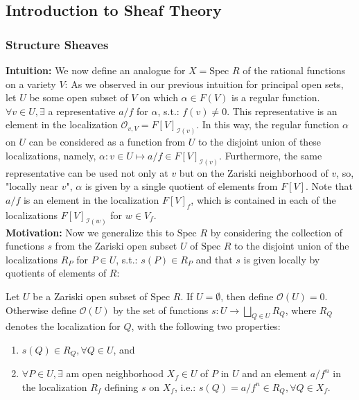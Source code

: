\subsection{Introduction to Sheaf Theory}

\subsubsection{Structure Sheaves}

\noindent\textbf{Intuition:} We now define an analogue for $X= \text{Spec }R$ of the rational functions on a variety $V$: As we observed in our previous intuition for principal open sets, let $U$ be some open subset of $V$ on which $\alpha \in F(V)$ is a regular function. $\forall v\in U, \exists$ a representative $a/f$ for $\alpha$, s.t.: $f(v) \neq 0$. This representative is an element in the localization $\mathcal{O}_{v,V} = F[V]_{\mathcal{I} (v)}$. In this way, the regular function $\alpha$ on $U$ can be considered as a function from $U$ to the disjoint union of these localizations, namely, $\alpha: v\in U \mapsto a/f \in F[V]_{\mathcal{I} (v)}$. Furthermore, the same representative can be used not only at $v$ but on the Zariski neighborhood of $v$, so, "locally near $v$", $\alpha$ is given by a single quotient of elements from $F[V]$. Note that $a/f$ is an element in the localization $F[V]_{f}$, which is contained in each of the localizations $F[V]_{\mathcal{I} (w)}$ for $w \in V_f$.\\

\noindent\textbf{Motivation:} Now we generalize this to $\text{Spec }R$ by considering the collection of functions $s$ from the Zariski open subset $U$ of $\text{Spec }R$ to the disjoint union of the localizations $R_P$ for $P\in U$, s.t.: $s(P) \in R_P$ and that $s$ is given locally by quotients of elements of $R$:

\begin{definition}
    Let $U$ be a Zariski open subset of $\text{Spec }R$. If $U= \emptyset$, then define $\mathcal{O} (U)=0$. Otherwise define $\mathcal{O} (U)$ by the set of functions $s: U \to \bigsqcup_{Q\in U} R_Q$, where $R_Q$ denotes the localization for $Q$, with the following two properties:
    \begin{enumerate}
        \item $s(Q) \in R_Q ,\forall Q\in U$, and
        \item $\forall P\in U, \exists$ am open neighborhood $X_f \in U$ of $P$ in $U$ and an element $a/f^n$ in the localization $R_f$ defining $s$ on $X_f$, i.e.: $s(Q) = a/f^n \in R_Q,\forall Q\in X_f$.
    \end{enumerate}
\end{definition}

